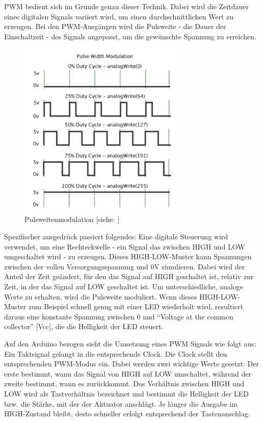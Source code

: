 \ac{PWM} bedient sich im Grunde genau dieser Technik.
Dabei wird die Zeitdauer eines digitalen Signals variiert wird, um einen durchschnittlichen Wert zu erzeugen.
Bei den \ac{PWM}-Ausgängen wird die Pulsweite - die Dauer der Einschaltzeit - des Signals angepasst, um die gewünschte Spannung zu erreichen.

\begin{figure}[htbp]
	\centering
	\includegraphics [width=8cm] {img/pulsweite}
	\caption{Pulsweitenmodulation [siehe: \cite*[siehe ][]{PWM}]}
	\label{fig:pulsweite}
\end{figure}

Spezifischer ausgedrück passiert folgendes:
Eine digitale Steuerung wird verwendet, um eine Rechteckwelle - ein Signal das zwischen HIGH und LOW umgeschaltet wird - zu erzeugen.
Dieses HIGH-LOW-Muster kann Spannungen zwischen der vollen Versorgungsspannung und 0V simulieren.
Dabei wird der Anteil der Zeit geändert, für den das Signal auf HIGH geschaltet ist, relativ zur Zeit, in der das Signal auf LOW geschaltet ist.
Um unterschiedliche, analoge Werte zu erhalten, wird die Pulsweite moduliert.
Wenn dieses HIGH-LOW-Muster zum Beispiel schnell genug mit einer LED wiederholt wird, resultiert daraus eine konstante Spannung zwischen 0 und \enquote{Voltage at the common collector} [Vcc], die die Helligkeit der LED steuert.

Auf den Arduino bezogen sieht die Umsetzung eines \ac{PWM} Signals wie folgt aus:
Ein Taktsignal gelangt in die entsprechende Clock.
Die Clock stellt den entsprechenden \ac{PWM}-Modus ein.
Dabei werden zwei wichtige Werte gesetzt:
Der erste bestimmt, wann das Signal von HIGH auf LOW umschaltet, während der zweite bestimmt, wann es zurückkommt.
Das Verhältnis zwischen HIGH und LOW wird als Tastverhältnis bezeichnet und bestimmt die Helligkeit der LED bzw. die Stärke, mit der der Aktuator anschlägt.
Je länger die Ausgabe im HIGH-Zustand bleibt, desto schneller erfolgt entsprechend der Tastenanschlag.

